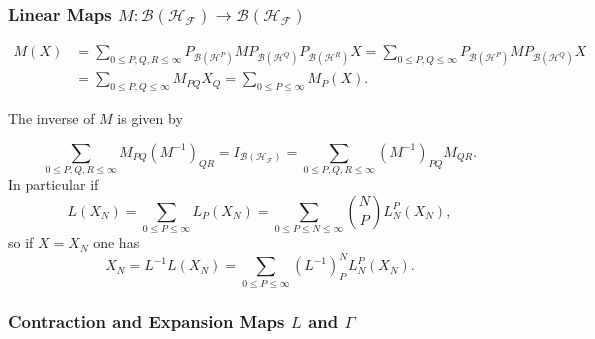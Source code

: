 \documentclass[aps,preprint]{revtex4}%
\begin{document}
\subsubsection{Linear Maps $M:\mathcal{B}\left(  \mathcal{H}_{\mathcal{F}%
}\right)  \rightarrow\mathcal{B}\left(  \mathcal{H}_{\mathcal{F}}\right)  $}%

\begin{align}
M\left(  X\right)   &  =\sum_{0\leq P,Q,R\leq\infty}P_{\mathcal{B}\left(
\mathcal{H}^{P}\right)  }MP_{\mathcal{B}\left(  \mathcal{H}^{Q}\right)
}P_{\mathcal{B}\left(  \mathcal{H}^{R}\right)  }X=\sum_{0\leq P,Q\leq\infty
}P_{\mathcal{B}\left(  \mathcal{H}^{P}\right)  }MP_{\mathcal{B}\left(
\mathcal{H}^{Q}\right)  }X\nonumber\\
&  =\sum_{0\leq P,Q\leq\infty}M_{PQ}X_{Q}=\sum_{0\leq P\leq\infty}M_{P}\left(
X\right)  .
\end{align}


The inverse of $M$ is given by%

\begin{equation}
\sum_{0\leq P,Q,R\leq\infty}M_{PQ}\left(  M^{-1}\right)  _{QR}=I_{\mathcal{B}%
\left(  \mathcal{H}_{\mathcal{F}}\right)  }=\sum_{0\leq P,Q,R\leq\infty
}\left(  M^{-1}\right)  _{PQ}M_{QR}.
\end{equation}
In particular if
\begin{equation}
L\left(  X_{N}\right)  =\sum_{0\leq P\leq\infty}L_{P}\left(  X_{N}\right)
=\sum_{0\leq P\leq N\leq\infty}\binom{N}{P}L_{N}^{P}\left(  X_{N}\right)
,\nonumber
\end{equation}
so if $X=X_{N}$ one has
\begin{equation}
X_{N}=L^{-1}L\left(  X_{N}\right)  =\sum_{0\leq P\leq\infty}\left(
L^{-1}\right)  _{P}^{N}L_{N}^{P}\left(  X_{N}\right)  .
\end{equation}


\subsubsection{Contraction and Expansion Maps $L$ and $\Gamma$}%
\end{document}
